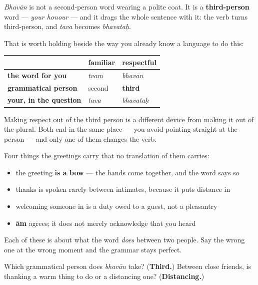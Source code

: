 \begin{culture}
\emph{Bhavān} is not a second-person word wearing a polite coat. It is a \textbf{third-person} word — \emph{your honour} — and it drags the whole sentence with it: the verb turns third-person, and \emph{tava} becomes \emph{bhavataḥ}.

That is worth holding beside the way you already know a language to do this:

\noindent
\begin{tabularx}{\linewidth}{@{}>{\raggedright\arraybackslash}X>{\raggedright\arraybackslash}X>{\raggedright\arraybackslash}X@{}}
\toprule
\textbf{} & \textbf{familiar} & \textbf{respectful} \\
\midrule
\textbf{the word for you} & \emph{tvam} & \emph{bhavān} \\
\textbf{grammatical person} & second & \textbf{third} \\
\textbf{your, in the question} & \emph{tava} & \emph{bhavataḥ} \\
\bottomrule
\end{tabularx}

Making respect out of the third person is a different device from making it out of the plural. Both end in the same place — you avoid pointing straight at the person — and only one of them changes the verb.
\end{culture}

\begin{tcolorbox}[breakable,skin=enhanced,colback=violet!6,colframe=violet!45!black,boxrule=0.5pt,arc=1mm,left=6pt,right=6pt,top=4pt,bottom=4pt,fonttitle=\bfseries,title={Across the family}]
Four things the greetings carry that no translation of them carries:

\begin{itemize}
\raggedright
  \item the greeting \textbf{is a bow} — the hands come together, and the word says so
  \item thanks is spoken rarely between intimates, because it puts distance in
  \item welcoming someone in is a duty owed to a guest, not a pleasantry
  \item \textbf{ām} agrees; it does not merely acknowledge that you heard
\end{itemize}

Each of these is about what the word \emph{does} between two people. Say the wrong one at the wrong moment and the grammar stays perfect.
\end{tcolorbox}

\begin{tcolorbox}[breakable,colback=teal!4,colframe=teal!35!black,title={Before you move on}]
Which grammatical person does \emph{bhavān} take? (\textbf{Third.}) Between close friends, is thanking a warm thing to do or a distancing one? (\textbf{Distancing.})
\end{tcolorbox}
